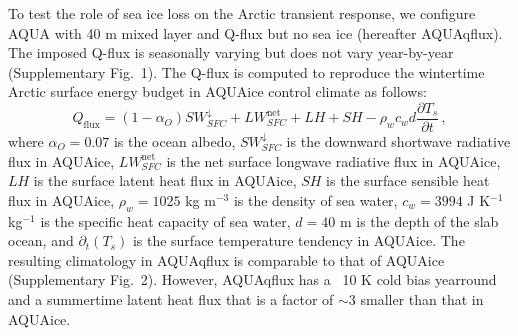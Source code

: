 \documentclass[draft]{agujournal2019}
\begin{document}
To test the role of sea ice loss on the Arctic transient response, we configure AQUA with 40 m mixed layer and Q-flux but no sea ice (hereafter AQUAqflux). The imposed Q-flux is seasonally varying but does not vary year-by-year (Supplementary Fig.~1). The Q-flux is computed to reproduce the wintertime Arctic surface energy budget in AQUAice control climate as follows:
\begin{equation}
    Q_{\mathrm{flux}} =  (1-\alpha_O)SW^{\downarrow}_{SFC} + LW^{\text{net}}_{SFC} + LH + SH - \rho_w c_w d\frac{\partial T_s}{\partial t}\, ,
\end{equation}
where $\alpha_O=0.07$ is the ocean albedo, $SW^{\downarrow}_{SFC}$ is the downward shortwave radiative flux in AQUAice, $LW^{\text{net}}_{SFC}$ is the net surface longwave radiative flux in AQUAice, $LH$ is the surface latent heat flux in AQUAice, $SH$ is the surface sensible heat flux in AQUAice, $\rho_w=1025$ kg m$^{-3}$ is the density of sea water, $c_w=3994$ J K$^{-1}$ kg$^{-1}$ is the specific heat capacity of sea water, $d=40$ m is the depth of the slab ocean, and $\partial_t(T_s)$ is the surface temperature tendency in AQUAice. The resulting climatology in AQUAqflux is comparable to that of AQUAice (Supplementary Fig.~2). However, AQUAqflux has a ~10 K cold bias yearround and a summertime latent heat flux that is a factor of $\sim 3$ smaller than that in AQUAice.

\end{document}
